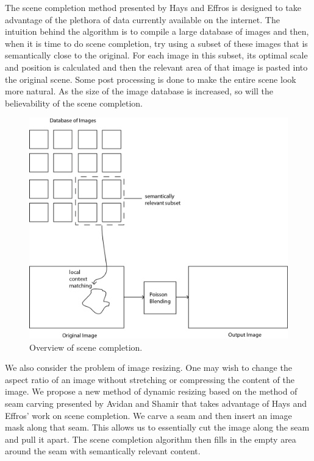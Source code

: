 \documentclass[11pt]{amsart}
\begin{document}
The scene completion method presented by Hays and Effros is designed to take advantage of the plethora of data currently available on the internet. The intuition behind the algorithm is to compile a large database of images and then, when it is time to do scene completion, try using a subset of these images that is semantically close to the original. For each image in this subset, its optimal scale and position is calculated and then the relevant area of that image is pasted into the original scene. Some post processing is done to make the entire scene look more natural. As the size of the image database is increased, so will the believability of the scene completion.

\begin{figure}[htbp]
\begin{center}
\includegraphics[scale=.6]{projectOverview.png}
\caption{Overview of scene completion.}
\label{llamaSeam}
\end{center}
\end{figure}

We also consider the problem of image resizing. One may wish to change the aspect ratio of an image without stretching or compressing the content of the image. We propose a new method of dynamic resizing based on the method of seam carving presented by Avidan and Shamir \cite{Avidan:2007} that takes advantage of Hays and Effros' work on scene completion. We carve a seam and then insert an image mask along that seam. This allows us to essentially cut the image along the seam and pull it apart. The scene completion algorithm then fills in the empty area around the seam with semantically relevant content. 
\end{document}
